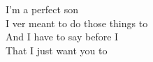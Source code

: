 \songwordfb{
}I'm  a perfect son \\
I ver meant to do those things to  \\
And  I have to say before I  \\
\songwordfb{} That I just want you to  \\
